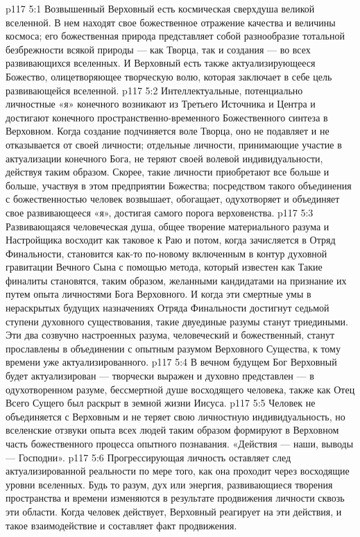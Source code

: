 \vs p117 5:1 Возвышенный Верховный есть космическая сверхдуша великой вселенной. В нем находят свое божественное отражение качества и величины космоса; его божественная природа представляет собой разнообразие тотальной безбрежности всякой природы --- как Творца, так и создания --- во всех развивающихся вселенных. И Верховный есть также актуализирующееся Божество, олицетворяющее творческую волю, которая заключает в себе цель развивающейся вселенной.
\vs p117 5:2 Интеллектуальные, потенциально личностные «я» конечного возникают из Третьего Источника и Центра и достигают конечного пространственно\hyp{}временного Божественного синтеза в Верховном. Когда создание подчиняется воле Творца, оно не подавляет и не отказывается от своей личности; отдельные личности, принимающие участие в актуализации конечного Бога, не теряют своей волевой индивидуальности, действуя таким образом. Скорее, такие личности приобретают все больше и больше, участвуя в этом предприятии Божества; посредством такого объединения с божественностью человек возвышает, обогащает, одухотворяет и объединяет свое развивающееся «я», достигая самого порога верховенства.
\vs p117 5:3 \pc Развивающаяся человеческая душа, общее творение материального разума и Настройщика восходит как таковое к Раю и потом, когда зачисляется в Отряд Финальности, становится как\hyp{}то по\hyp{}новому включенным в контур духовной гравитации Вечного Сына с помощью метода, который известен как  Такие финалиты становятся, таким образом, желанными кандидатами на признание их путем опыта личностями Бога Верховного. И когда эти смертные умы в нераскрытых будущих назначениях Отряда Финальности достигнут седьмой ступени духовного существования, такие двуединые разумы станут триедиными. Эти два созвучно настроенных разума, человеческий и божественный, станут прославлены в объединении с опытным разумом Верховного Существа, к тому времени уже актуализированного.
\vs p117 5:4 В вечном будущем Бог Верховный будет актуализирован --- творчески выражен и духовно представлен --- в одухотворенном разуме, бессмертной душе восходящего человека, также как Отец Всего Сущего был раскрыт в земной жизни Иисуса.
\vs p117 5:5 \pc Человек не объединяется с Верховным и не теряет свою личностную индивидуальность, но вселенские отзвуки опыта всех людей таким образом формируют в Верховном часть божественного процесса опытного познавания. «Действия --- наши, выводы --- Господни».
\vs p117 5:6 Прогрессирующая личность оставляет след актуализированной реальности по мере того, как она проходит через восходящие уровни вселенных. Будь то разум, дух или энергия, развивающиеся творения пространства и времени изменяются в результате продвижения личности сквозь эти области. Когда человек действует, Верховный реагирует на эти действия, и такое взаимодействие и составляет факт продвижения.
